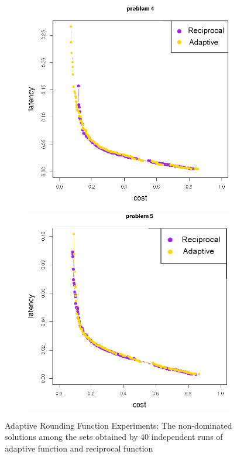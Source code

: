 \begin{figure}[h!]
\begin{subfigure}{0.49\textwidth}
	   \caption{}
   \end{subfigure}
   \begin{subfigure}{0.49\textwidth}
       \includegraphics[width=\textwidth]{pics/transfer_problem4.png}
	   \caption{}
   \end{subfigure}
   \begin{subfigure}{0.49\textwidth}
       \includegraphics[width=\textwidth]{pics/transfer_problem5.png}
	   \caption{}
   \end{subfigure}
   \caption{Adaptive Rounding Function Experiments: The non-dominated solutions among the sets obtained by 40 independent runs of adaptive function and reciprocal
   function}
   \label{fig:transfer}
\end{figure}

